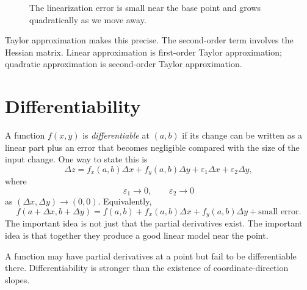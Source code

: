 \documentclass[11pt]{article}
\begin{document}
\begin{figure}[H]
\centering
{}
\caption{The linearization error is small near the base point and grows quadratically as we move away.}
\end{figure}

\begin{notebox}
Taylor approximation makes this precise. The second-order term involves the Hessian matrix. Linear approximation is first-order Taylor approximation; quadratic approximation is second-order Taylor approximation.
\end{notebox}

\section{Differentiability}

A function $f(x,y)$ is \emph{differentiable} at $(a,b)$ if its change can be written as a linear part plus an error that becomes negligible compared with the size of the input change. One way to state this is
\[
\Delta z=f_x(a,b)\Delta x+f_y(a,b)\Delta y+\varepsilon_1\Delta x+\varepsilon_2\Delta y,
\]
where
\[
\varepsilon_1\to 0,\qquad \varepsilon_2\to 0
\]
as $(\Delta x,\Delta y)\to (0,0)$. Equivalently,
\[
f(a+\Delta x,b+\Delta y)=f(a,b)+f_x(a,b)\Delta x+f_y(a,b)\Delta y+\text{small error}.
\]
The important idea is not just that the partial derivatives exist. The important idea is that together they produce a good linear model near the point.

\begin{warningbox}
A function may have partial derivatives at a point but fail to be differentiable there. Differentiability is stronger than the existence of coordinate-direction slopes.
\end{warningbox}
\end{document}
